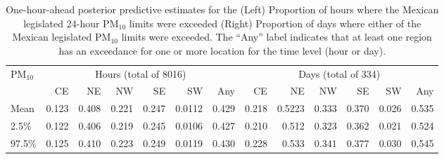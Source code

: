 \documentclass[alpha-refs]{wiley-article}
\begin{document}
\begin{table}[H]
\centering
\footnotesize
\begin{tabular}{l|rrrrrr|rrrrrr}
\hline
$\text{PM}_{10}$ &\multicolumn{6}{c|}{Hours (total of 8016) } & \multicolumn{6}{|c}{Days (total of 334)}\\
 & CE & NE & NW & SE & SW & Any & CE & NE & NW & SE & SW & Any \\
  \hline
 Mean & 0.123 & 0.408 & 0.221 & 0.247 & 0.0112 & 0.429 & 0.218 & 0.5223 & 0.333 & 0.370 & 0.026 & 0.535 \\
  2.5\% & 0.122 & 0.406 & 0.219 & 0.245 & 0.0106 & 0.427 & 0.210 & 0.512 & 0.323 & 0.362 & 0.021 & 0.524 \\
  97.5\% & 0.125 & 0.410 & 0.223 & 0.249 & 0.0119 & 0.430 & 0.228 & 0.533 & 0.341 & 0.377 & 0.030 & 0.545 \\
   \hline
\end{tabular}
\caption{One-hour-ahead posterior predictive estimates for the (Left) Proportion of hours where the Mexican legislated 24-hour $\text{PM}_{10}$ limits were exceeded (Right) Proportion of days where either of the Mexican legislated $\text{PM}_{10}$ limits were exceeded. The ``Any'' label indicates that at least one region has an exceedance for one or more location for the time level (hour or day). }\label{tab:pm10_region}
\end{table}
\vspace{-3mm}
\end{document}
